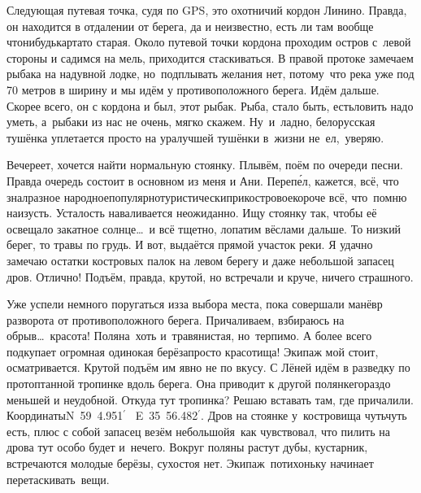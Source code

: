 Следующая путевая точка, судя по GPS, это охотничий кордон Линино. Правда, он находится в отдалении от берега, да и неизвестно, есть ли там вообще что\sdash нибудь\mdash карта\sdash то старая. Около путевой точки кордона проходим остров с~левой стороны и садимся на мель, приходится стаскиваться. В правой протоке замечаем рыбака на надувной лодке, но~подплывать желания нет, потому~что река уже под 70 метров в ширину и мы идём у противоположного берега. Идём дальше. Скорее всего, он с кордона и был, этот рыбак. Рыба, стало быть, есть\mdash ловить надо уметь, а~рыбаки из нас не очень, мягко скажем. Ну~и~ладно, белорусская тушёнка уплетается просто на ура\mdash лучшей тушёнки в~жизни не~ел,~уверяю.

Вечереет, хочется найти нормальную стоянку. Плывём, поём по очереди песни. Правда очередь состоит в основном из меня и Ани. Переп\'{е}л, кажется, всё, что знал\mdash разное народное\sdash популярно\sdash туристически\sdash прикостровое\mdash короче всё, что~помню наизусть. Усталость наваливается неожиданно. Ищу стоянку так, чтобы её освещало закатное солнце\ldots~и всё тщетно, лопатим вёслами дальше. То низкий берег, то травы по грудь. И вот, выдаётся прямой участок реки. Я удачно замечаю остатки костровых палок на левом берегу и даже небольшой запасец дров. Отлично! Подъём, правда, крутой, но встречали и круче, ничего страшного.

Уже успели немного поругаться из\sdash за выбора места, пока совершали манёвр разворота от противоположного берега. Причаливаем, взбираюсь на обрыв\ldots~красота! Поляна~хоть и~травянистая, но~терпимо. А более всего подкупает огромная одинокая берёза\mdash просто красотища! Экипаж мой стоит, осматривается. Крутой подъём им явно не по вкусу. С Лёней идём в разведку по протоптанной тропинке вдоль берега. Она приводит к другой полянке\mdash гораздо меньшей и неудобной. Откуда тут тропинка? 
\newpage
Решаю вставать там, где причалили. Координаты\mdash N~59\degree~4.951$^\prime$~ E~35\degree~56.482$^\prime$. Дров на стоянке у~костровища чуть\sdash чуть есть, плюс с собой запасец везём небольшой\mdash я~как чувствовал, что пилить на дрова тут особо будет и~нечего. Вокруг поляны растут дубы, кустарник, встречаются молодые берёзы, сухостоя нет. Экипаж~потихоньку начинает перетаскивать~вещи. 

